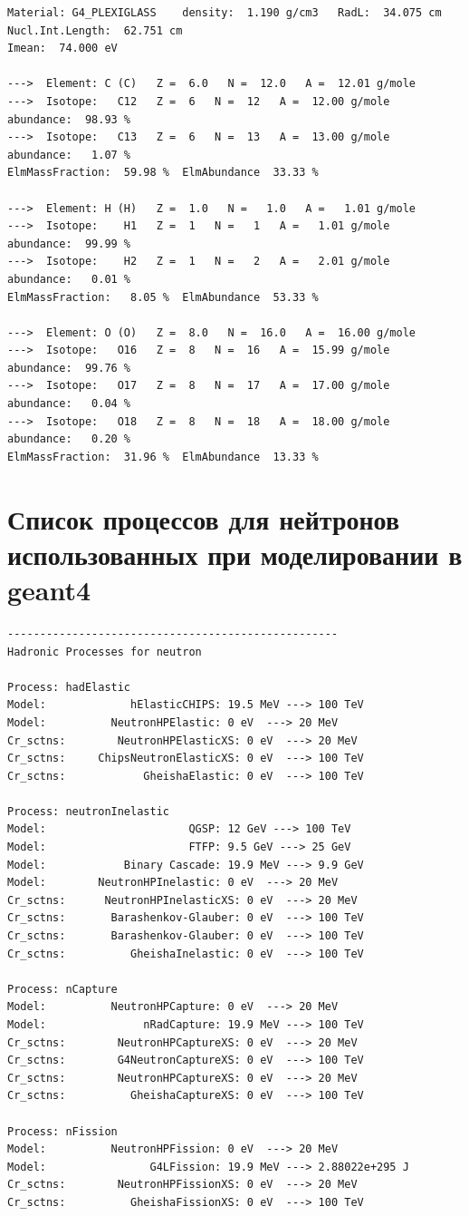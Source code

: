 {\begin{verbatim}
Material: G4_PLEXIGLASS    density:  1.190 g/cm3   RadL:  34.075 cm   Nucl.Int.Length:  62.751 cm 
Imean:  74.000 eV 

--->  Element: C (C)   Z =  6.0   N =  12.0   A =  12.01 g/mole
--->  Isotope:   C12   Z =  6   N =  12   A =  12.00 g/mole   abundance:  98.93 %
--->  Isotope:   C13   Z =  6   N =  13   A =  13.00 g/mole   abundance:   1.07 %
ElmMassFraction:  59.98 %  ElmAbundance  33.33 % 

--->  Element: H (H)   Z =  1.0   N =   1.0   A =   1.01 g/mole
--->  Isotope:    H1   Z =  1   N =   1   A =   1.01 g/mole   abundance:  99.99 %
--->  Isotope:    H2   Z =  1   N =   2   A =   2.01 g/mole   abundance:   0.01 %
ElmMassFraction:   8.05 %  ElmAbundance  53.33 % 

--->  Element: O (O)   Z =  8.0   N =  16.0   A =  16.00 g/mole
--->  Isotope:   O16   Z =  8   N =  16   A =  15.99 g/mole   abundance:  99.76 %
--->  Isotope:   O17   Z =  8   N =  17   A =  17.00 g/mole   abundance:   0.04 %
--->  Isotope:   O18   Z =  8   N =  18   A =  18.00 g/mole   abundance:   0.20 %
ElmMassFraction:  31.96 %  ElmAbundance  13.33 % 
\end{verbatim}
}
\section{Список процессов для нейтронов использованных при моделировании в geant4}

\label{list:geantNeuproc}
\tiny{
	\begin{verbatim}
---------------------------------------------------
Hadronic Processes for neutron

Process: hadElastic
Model:             hElasticCHIPS: 19.5 MeV ---> 100 TeV
Model:          NeutronHPElastic: 0 eV  ---> 20 MeV
Cr_sctns:        NeutronHPElasticXS: 0 eV  ---> 20 MeV
Cr_sctns:     ChipsNeutronElasticXS: 0 eV  ---> 100 TeV
Cr_sctns:            GheishaElastic: 0 eV  ---> 100 TeV

Process: neutronInelastic
Model:                      QGSP: 12 GeV ---> 100 TeV
Model:                      FTFP: 9.5 GeV ---> 25 GeV
Model:            Binary Cascade: 19.9 MeV ---> 9.9 GeV
Model:        NeutronHPInelastic: 0 eV  ---> 20 MeV
Cr_sctns:      NeutronHPInelasticXS: 0 eV  ---> 20 MeV
Cr_sctns:       Barashenkov-Glauber: 0 eV  ---> 100 TeV
Cr_sctns:       Barashenkov-Glauber: 0 eV  ---> 100 TeV
Cr_sctns:          GheishaInelastic: 0 eV  ---> 100 TeV

Process: nCapture
Model:          NeutronHPCapture: 0 eV  ---> 20 MeV
Model:               nRadCapture: 19.9 MeV ---> 100 TeV
Cr_sctns:        NeutronHPCaptureXS: 0 eV  ---> 20 MeV
Cr_sctns:        G4NeutronCaptureXS: 0 eV  ---> 100 TeV
Cr_sctns:        NeutronHPCaptureXS: 0 eV  ---> 20 MeV
Cr_sctns:          GheishaCaptureXS: 0 eV  ---> 100 TeV

Process: nFission
Model:          NeutronHPFission: 0 eV  ---> 20 MeV
Model:                G4LFission: 19.9 MeV ---> 2.88022e+295 J  
Cr_sctns:        NeutronHPFissionXS: 0 eV  ---> 20 MeV
Cr_sctns:          GheishaFissionXS: 0 eV  ---> 100 TeV
\end{verbatim}
}


